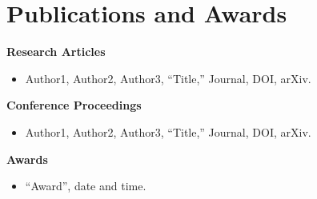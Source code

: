 \section*{\bfseries\rmfamily{}Publications and Awards}

{\bfseries\rmfamily{}Research Articles}
\begin{itemize}\rmfamily{}
\item Author1, Author2, Author3,
``Title,''
Journal,
DOI,
arXiv.
\end{itemize}

{\bfseries\rmfamily{}Conference Proceedings}
\begin{itemize}\rmfamily{}
\item Author1, Author2, Author3,
``Title,''
Journal,
DOI,
arXiv.
\end{itemize}

{\bfseries\rmfamily{}Awards}
\begin{itemize}\rmfamily{}
\item ``Award'', date and time.
\end{itemize}

\pagebreak